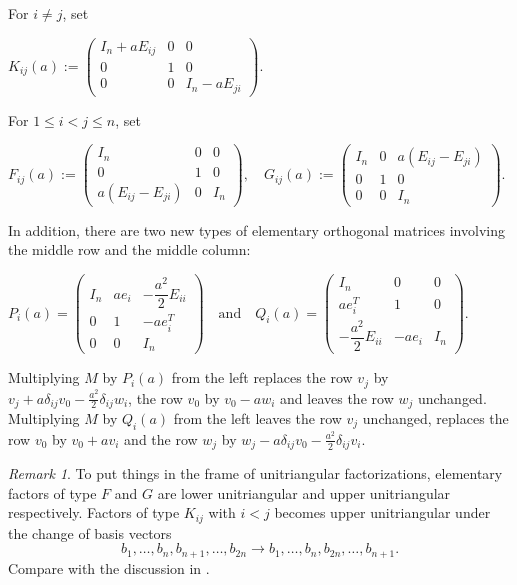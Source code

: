 \documentclass[11pt]{amsart}
\theoremstyle{definition}
\theoremstyle{remark}
\theoremstyle{remark}
\newtheorem{remark}[theorem]{Remark}
\begin{document}
For $i\neq j$, set 
\begin{center}
$    K_{ij}(a):=
            \begin{pmatrix}
                I_n+aE_{ij} & 0 & 0\\
                0 & 1 & 0\\
                0 & 0 & I_n-aE_{ji}
            \end{pmatrix}.$
\end{center}

For $1\le i<j\le n$, set
\begin{center}
$F_{ij}(a):=
\begin{pmatrix}
I_n & 0 & 0\\
0 & 1 & 0\\
a(E_{ij}-E_{ji}) & 0 & I_n
\end{pmatrix}, \quad
G_{ij}(a):=
\begin{pmatrix}
I_n & 0 & a(E_{ij}-E_{ji}) \\
0 & 1 & 0\\
0 & 0 & I_n
\end{pmatrix}.$
\end{center}

In addition, there are two new types of elementary orthogonal matrices involving the middle row and the middle column:
\begin{center}
 $   P_i(a)=
    \begin{pmatrix}
        I_n&ae_i&-\dfrac{a^2}{2} E_{ii}\\
        0&1&-ae_i^T\\
        0&0&I_n
    \end{pmatrix} \quad \text{and} \quad
    Q_i(a)=
    \begin{pmatrix}
        I_n   &   0 &   0\\
        a e_i^T   &   1 &   0\\
        -\dfrac{a^2}{2} E_{ii}  &   -a e_i    &   I_n
    \end{pmatrix}.$
\end{center}
Multiplying $M$ by $P_i(a)$ from the left replaces the row $v_j$ by $v_j + a \delta_{ij} v_0 - \frac{a^2}{2} \delta_{ij} w_i$, the row $v_0$ by $v_0 - a w_i$ and leaves the row $w_j$ unchanged. 
Multiplying $M$ by $Q_i(a)$ from the left leaves the row $v_j$ unchanged, replaces the row $v_0$ by $v_0 + a v_i$ and the row $w_j$ by $w_j - a \delta_{ij} v_0 - \frac{a^2}{2} \delta_{ij} v_i$. 

\begin{remark}
    To put things in the frame of unitriangular factorizations, elementary factors of type $F$ and $G$ are lower unitriangular and upper unitriangular respectively. Factors of type $K_{ij}$ with $i < j$ becomes upper unitriangular under the change of basis vectors
    \[
        b_1, \dots, b_n, b_{n+1}, \dots, b_{2n} \to  b_1, \dots, b_n, b_{2n}, \dots, b_{n+1}. 
    \]
    Compare with the discussion in \cite[pp.\@ 2-3]{MR5101717}.
\end{remark}
\end{document}

